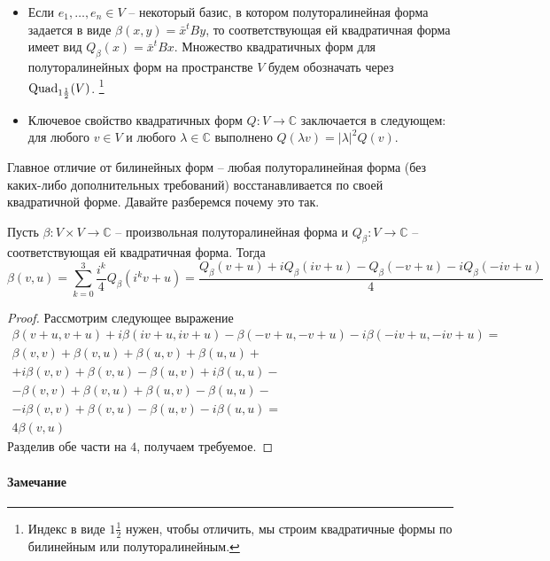 \begin{itemize}
\item Если $e_1,\ldots,e_n\in V$ -- некоторый базис, в котором полуторалинейная форма задается в виде $\beta(x, y) = \bar x^t B y$, то соответствующая ей квадратичная форма имеет вид $Q_\beta(x) = \bar x^t B x$.
Множество квадратичных форм для полуторалинейных форм на пространстве $V$ будем обозначать через $\operatorname{Quad}_{1\frac{1}{2}}(V)$.%
\footnote{Индекс в виде $1\frac{1}{2}$ нужен, чтобы отличить, мы строим квадратичные формы по билинейным или полуторалинейным.}

\item Ключевое свойство квадратичных форм $Q\colon V\to \mathbb C$ заключается в следующем: для любого $v\in V$ и любого $\lambda\in \mathbb C$ выполнено $Q(\lambda v) = |\lambda|^2Q(v)$.
\end{itemize}

Главное отличие от билинейных форм -- любая полуторалинейная форма (без каких-либо дополнительных требований) восстанавливается по своей квадратичной форме.
Давайте разберемся почему это так.

\begin{claim}
\label{claim::CPolarization}
Пусть $\beta\colon V\times V\to \mathbb C$ -- произвольная полуторалинейная форма и $Q_\beta\colon V\to \mathbb C$ -- соответствующая ей квадратичная форма.
Тогда 
\[
\beta(v, u) = \sum_{k=0}^3 \frac{i^k}{4}Q_\beta\left(i^k v + u\right) = \frac{Q_\beta(v+u) + iQ_\beta(iv+u) - Q_\beta(-v + u) -i Q_\beta(-iv+u)}{4}
\]
\end{claim}
\begin{proof}
Рассмотрим следующее выражение
\begin{gather*}
\beta(v + u, v+ u) + i\beta(iv + u, iv+ u) - \beta(-v + u, -v+ u) -i \beta(-iv + u, -iv+ u)=\\
\beta(v,v)+\beta(v,u)+\beta(u,v)+\beta(u,u)+\\
+i\beta(v,v)+\beta(v,u)-\beta(u,v)+i\beta(u,u)-\\
-\beta(v,v)+\beta(v,u)+\beta(u,v)-\beta(u,u)-\\
-i\beta(v,v)+\beta(v,u)-\beta(u,v)-i\beta(u,u)=\\
4 \beta(v, u)
\end{gather*}
Разделив обе части на $4$, получаем требуемое.
\end{proof}

\paragraph{Замечание}

